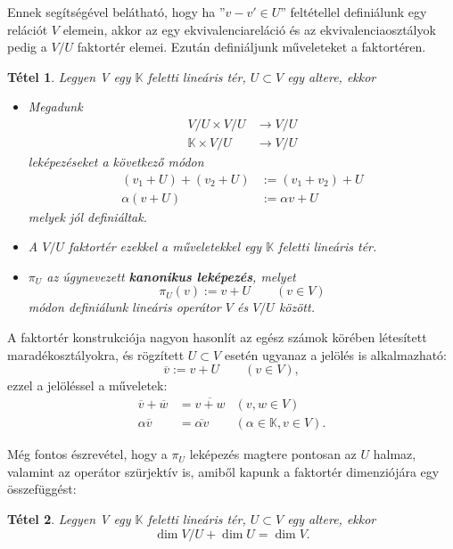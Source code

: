 \documentclass[oneside, titlepage, 12pt, a4paper]{report}
\newtheorem{theorem}{Tétel}[section]
\begin{document}
Ennek segítségével belátható, hogy ha  ''$v - v' \in U$'' feltétellel definiálunk egy relációt $V$ elemein, akkor az egy ekvivalenciareláció és az ekvivalenciaosztályok pedig a $V / U$ faktortér elemei. Ezután definiáljunk műveleteket a faktortéren.
\begin{theorem}
Legyen V egy $\mathbb{K}$ feletti lineáris tér, $U \subset V$ egy altere, ekkor
\begin{itemize}
\item
Megadunk	%
\begin{align*}
V / U \times V / U & \longrightarrow V / U \\
\mathbb{K} \times V / U & \longrightarrow V / U
\end{align*}
leképezéseket a következő módon
\begin{align}
(v_1 + U) + (v_2 + U) &:= (v_1 + v_2) + U \\
\alpha (v + U) &:= \alpha v + U
\end{align}
melyek jól definiáltak.
\item
A $V / U$ faktortér ezekkel a műveletekkel egy $\mathbb{K}$ feletti lineáris tér.
\item
$\pi_U$ az úgynevezett \textbf{kanonikus leképezés}, melyet
\begin{equation*}
\pi_U(v) := v + U \qquad (v \in V)
\end{equation*}
módon definiálunk lineáris operátor $V$ és $V / U$ között.
\end{itemize}
\end{theorem}

A faktortér konstrukciója nagyon hasonlít az egész számok körében létesített maradékosztályokra, és rögzített $U \subset V$ esetén ugyanaz a jelölés is alkalmazható:
\begin{equation*}
\overline{v} := v + U \qquad (v \in V),
\end{equation*}
ezzel a jelöléssel a műveletek:
\begin{align*}
\overline{v} + \overline{w} &= \overline{v + w} &(v, w \in V) \\
\alpha \overline{v} &= \overline{\alpha v} &(\alpha \in \mathbb{K}, v \in V).
\end{align*}

Még fontos észrevétel, hogy a $\pi_U$ leképezés magtere pontosan az $U$ halmaz, valamint az operátor szürjektív is, amiből kapunk a faktortér dimenziójára egy összefüggést:
\begin{theorem}
Legyen V egy $\mathbb{K}$ feletti lineáris tér, $U \subset V$ egy altere, ekkor
\begin{equation}
\dim V / U + \dim U = \dim V.
\end{equation}
\end{theorem}
\end{document}
